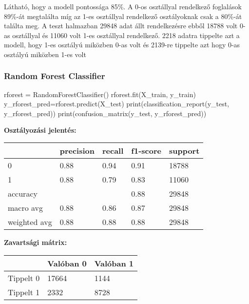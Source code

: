 \bigskip

Látható, hogy a modell pontossága 85\%. A 0-os osztállyal rendelkező foglalások 89\%-át megtalálta míg az 1-es osztállyal rendelkező osztályoknak csak a 80\%-át találta meg. A teszt halmazban 29848 adat állt rendelkezésre ebből 18788 volt 0-as osztállyal és 11060 volt 1-es osztállyal rendelkező. 2218 adatra tippelte azt a modell, hogy 1-es osztályú miközben 0-as volt és 2139-re tippelte azt hogy 0-as osztályú miközben 1-es volt

\subsubsection{Random Forest Classifier}
\begin{python}
rforest = RandomForestClassifier()
rforest.fit(X_train, y_train)
y_rforest_pred=rforest.predict(X_test)
print(classification_report(y_test, y_rforest_pred))
print(confusion_matrix(y_test, y_rforest_pred))
\end{python}

\medskip

\noindent \textbf{Osztályozási jelentés:}

\medskip

\begin{tabular}{|l|l|l|l|l|}
\hline
             & precision & recall & f1-score & support \\
\hline
0            & 0.88      & 0.94   & 0.91     & 18788   \\
\hline
1            & 0.88      & 0.79   & 0.83     & 11060   \\
\hline
accuracy     &           &        & 0.88     & 29848   \\
\hline
macro avg    & 0.88      & 0.86   & 0.87     & 29848   \\
\hline
weighted avg & 0.88      & 0.88   & 0.88     & 29848  \\
\hline
\end{tabular}

\medskip

\noindent \textbf{Zavartsági mátrix:}

\medskip

\begin{tabular}{|l|l|l|}
\hline
          & Valóban 0 & Valóban 1 \\
         \hline
Tippelt 0 & 17664     & 1144      \\
\hline
Tippelt 1 & 2332      & 8728   \\
\hline
\end{tabular}

